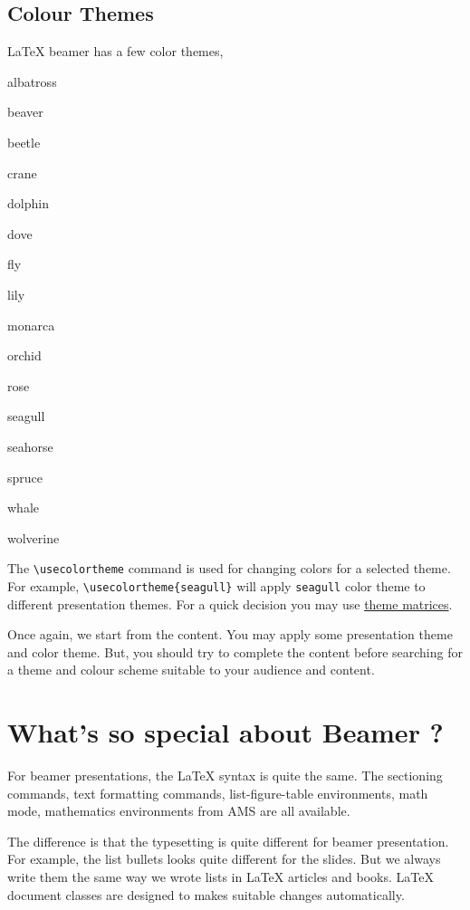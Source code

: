 \documentclass{article}
\begin{document}
\subsection{Colour Themes}
\LaTeX{} beamer has a few color themes,
\begin{enumerate*}
	\item albatross
	\item beaver
	\item beetle
	\item crane
	\item dolphin
	\item dove
	\item fly
	\item lily
	\item monarca
	\item orchid
	\item rose
	\item seagull
	\item seahorse
	\item spruce
	\item whale
	\item wolverine
\end{enumerate*}

	The \texttt{\textbackslash usecolortheme} command is used for changing colors for a selected theme. For example, \texttt{\textbackslash usecolortheme\{seagull\}} will apply \texttt{seagull} color theme to different presentation themes. For a quick decision you may use \href{https://hartwork.org/beamer-theme-matrix/}{theme matrices}.

	Once again, we start from the content. You may apply some presentation theme and color theme. But, you should try to complete the content before searching for a theme and colour scheme suitable to your audience and content.

\section{What's so special about Beamer ?}
	For beamer presentations, the \LaTeX{} syntax is quite the same. The sectioning commands, text formatting commands, list-figure-table environments, math mode, mathematics environments from AMS are all available.

	The difference is that the typesetting is quite different for beamer presentation. For example, the list bullets looks quite different for the slides. But we always write them the same way we wrote lists in \LaTeX{} articles and books. \LaTeX{} document classes are designed to makes suitable changes automatically.
\end{document}
